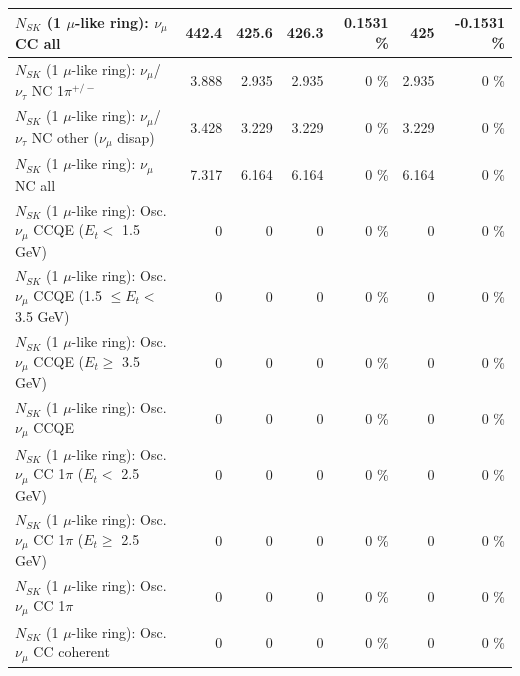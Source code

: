 \begin{table}
\begin{tabular}{| l | r | r | r  r | r  r |}
                                $N_{SK}$ (1 $\mu$-like ring): $\nu_{\mu}$ CC all &           442.4 &           425.6 &           426.3 &   0.1531 \%  &             425 &  -0.1531 \%  \\ 
\hline
              $N_{SK}$ (1 $\mu$-like ring): $\nu_\mu$/$\nu_\tau$ NC 1$\pi^{+/-}$ &           3.888 &           2.935 &           2.935 &        0 \%  &           2.935 &        0 \%  \\ 
   $N_{SK}$ (1 $\mu$-like ring): $\nu_\mu$/$\nu_\tau$ NC other ($\nu_\mu$ disap) &           3.428 &           3.229 &           3.229 &        0 \%  &           3.229 &        0 \%  \\ 
                                $N_{SK}$ (1 $\mu$-like ring): $\nu_{\mu}$ NC all &           7.317 &           6.164 &           6.164 &        0 \%  &           6.164 &        0 \%  \\ 
\hline
\hline
           $N_{SK}$ (1 $\mu$-like ring): Osc. $\nu_\mu$ CCQE ($E_{t} <$ 1.5 GeV) &               0 &               0 &               0 &        0 \%  &               0 &        0 \%  \\ 
  $N_{SK}$ (1 $\mu$-like ring): Osc. $\nu_\mu$ CCQE (1.5 $\leq E_{t} <$ 3.5 GeV) &               0 &               0 &               0 &        0 \%  &               0 &        0 \%  \\ 
        $N_{SK}$ (1 $\mu$-like ring): Osc. $\nu_\mu$ CCQE ($E_{t} \geq$ 3.5 GeV) &               0 &               0 &               0 &        0 \%  &               0 &        0 \%  \\ 
\hline
                               $N_{SK}$ (1 $\mu$-like ring): Osc. $\nu_\mu$ CCQE &               0 &               0 &               0 &        0 \%  &               0 &        0 \%  \\ 
\hline
      $N_{SK}$ (1 $\mu$-like ring): Osc. $\nu_\mu$ CC 1$\pi$ ($E_{t} <$ 2.5 GeV) &               0 &               0 &               0 &        0 \%  &               0 &        0 \%  \\ 
   $N_{SK}$ (1 $\mu$-like ring): Osc. $\nu_\mu$ CC 1$\pi$ ($E_{t} \geq$ 2.5 GeV) &               0 &               0 &               0 &        0 \%  &               0 &        0 \%  \\ 
\hline
                          $N_{SK}$ (1 $\mu$-like ring): Osc. $\nu_\mu$ CC 1$\pi$ &               0 &               0 &               0 &        0 \%  &               0 &        0 \%  \\ 
                        $N_{SK}$ (1 $\mu$-like ring): Osc. $\nu_\mu$ CC coherent &               0 &               0 &               0 &        0 \%  &               0 &        0 \%  \\ 

\end{tabular}
\end{table}
